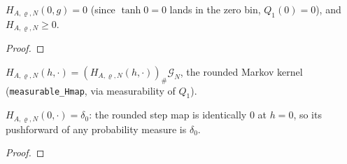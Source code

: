 \begin{lemma}
  \label{lem:Hmap-zero}
  \leanok
  $H_{A,\varrho,N}(0,g)=0$ (since $\tanh 0 = 0$ lands in the zero bin, $Q_1(0)=0$),
  and $H_{A,\varrho,N}\ge0$.
\end{lemma}
\begin{proof}\leanok{}\end{proof}

\begin{definition}
  \label{def:Hkernel}
  \leanok
  $H_{A,\varrho,N}(h,\cdot) = (H_{A,\varrho,N}(h,\cdot))_\#\mathcal G_N$, the rounded
  Markov kernel (\texttt{measurable\_Hmap}, via measurability of $Q_1$).
\end{definition}

\begin{lemma}
  \label{lem:Hkernel-absorbing}
  \leanok
  $H_{A,\varrho,N}(0,\cdot) = \delta_0$: the rounded step map is identically $0$ at
  $h=0$, so its pushforward of any probability measure is $\delta_0$.
\end{lemma}
\begin{proof}\leanok{}\end{proof}

